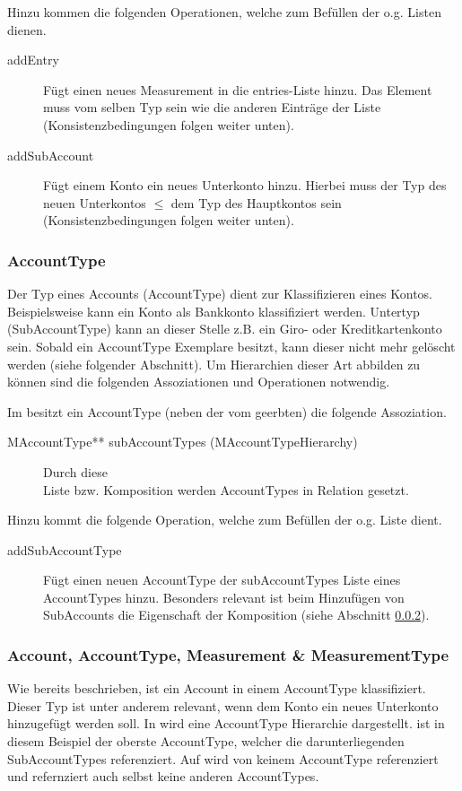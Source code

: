 Hinzu kommen die folgenden Operationen, welche zum Befüllen der o.g. Listen dienen.
\begin{description}
	\item[addEntry] Fügt einen neues Measurement in die entries-Liste hinzu. Das Element muss vom selben Typ sein wie die anderen Einträge der Liste (Konsistenzbedingungen folgen weiter unten).  
	\item[addSubAccount] Fügt einem Konto ein neues Unterkonto hinzu. Hierbei muss der Typ des neuen Unterkontos $\leq$ dem Typ des Hauptkontos sein (Konsistenzbedingungen folgen weiter unten).
\end{description}


\subsubsection{AccountType}
Der Typ eines Accounts (AccountType) dient zur Klassifizieren eines Kontos. Beispielsweise kann ein Konto als Bankkonto klassifiziert werden. Untertyp (SubAccountType) kann an dieser Stelle z.B. ein Giro- oder Kreditkartenkonto sein.
Sobald ein AccountType Exemplare besitzt, kann dieser nicht mehr gelöscht werden (siehe folgender Abschnitt). Um Hierarchien dieser Art abbilden zu können sind die folgenden Assoziationen und Operationen notwendig. 

Im \MM besitzt ein AccountType (neben der vom  geerbten) die folgende Assoziation.
\begin{description}
	\item[MAccountType** subAccountTypes (MAccountTypeHierarchy)] Durch diese \\Liste bzw. Komposition werden AccountTypes in Relation gesetzt.
\end{description}

Hinzu kommt die folgende Operation, welche zum Befüllen der o.g. Liste dient.
\begin{description}
	\item[addSubAccountType] Fügt einen neuen AccountType der subAccountTypes Liste eines AccountTypes hinzu. Besonders relevant ist beim Hinzufügen 
	von SubAccounts die Eigenschaft der Komposition (siehe Abschnitt \ref{Measurement:accUndAccType}).
\end{description}


\subsubsection{Account, AccountType, Measurement \& MeasurementType}\label{Measurement:accUndAccType}
Wie bereits beschrieben, ist ein Account in einem AccountType klassifiziert. Dieser Typ ist unter anderem relevant, wenn dem Konto ein neues Unterkonto hinzugefügt werden soll.  
In  wird eine AccountType Hierarchie dargestellt.  ist in diesem Beispiel der oberste AccountType, welcher die darunterliegenden SubAccountTypes referenziert. 
Auf  wird von keinem AccountType referenziert und refernziert auch selbst keine anderen AccountTypes.  

